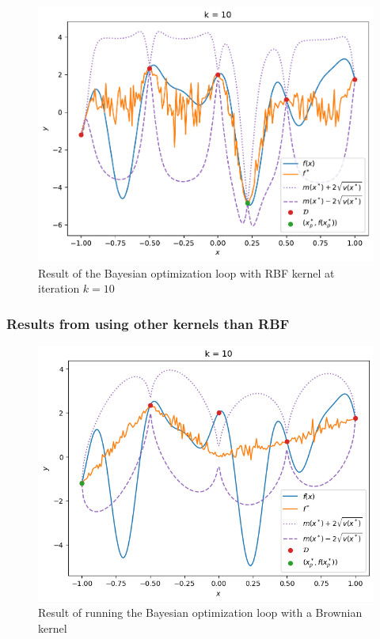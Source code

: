 \begin{figure}[H]
    \includegraphics[width=\textwidth]{figures/gp/b2-k_10.pdf}
    \caption{Result of the Bayesian optimization loop with RBF kernel at iteration $k = 10$}
\end{figure}
\subsubsection{Results from using other kernels than RBF}
\begin{figure}[H]
    \includegraphics[width=\textwidth]{figures/gp/Brownian.png}
    \caption{Result of running the Bayesian optimization loop with a Brownian kernel}
\end{figure}

